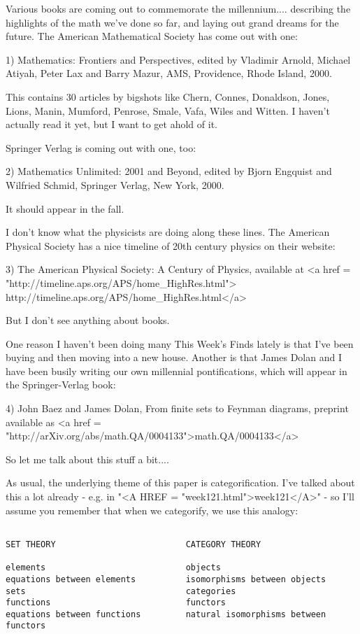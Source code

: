 

Various books are coming out to commemorate the millennium.... describing
the highlights of the math we've done so far, and laying out grand dreams 
for the future.  The American Mathematical Society has come out with one:

1) Mathematics: Frontiers and Perspectives, edited by Vladimir Arnold, 
Michael Atiyah, Peter Lax and Barry Mazur, AMS, Providence, Rhode 
Island, 2000.  

This contains 30 articles by bigshots like Chern, Connes, Donaldson,
Jones, Lions, Manin, Mumford, Penrose, Smale, Vafa, Wiles and Witten.
I haven't actually read it yet, but I want to get ahold of it.  

Springer Verlag is coming out with one, too:

2) Mathematics Unlimited: 2001 and Beyond, edited by Bjorn Engquist
and Wilfried Schmid, Springer Verlag, New York, 2000.  

It should appear in the fall.  

I don't know what the physicists are doing along these lines.  The 
American Physical Society has a nice timeline of 20th century physics 
on their website:

3) The American Physical Society: A Century of Physics, available
at <a href = "http://timeline.aps.org/APS/home_HighRes.html">
http://timeline.aps.org/APS/home_HighRes.html</a>

But I don't see anything about books.

One reason I haven't been doing many This Week's Finds lately is
that I've been buying and then moving into a new house.  Another
is that James Dolan and I have been busily writing our own millennial 
pontifications, which will appear in the Springer-Verlag book:

4) John Baez and James Dolan, From finite sets to Feynman diagrams,
preprint available as <a href = "http://arXiv.org/abs/math.QA/0004133">math.QA/0004133</a>

So let me talk about this stuff a bit....

As usual, the underlying theme of this paper is categorification.  
I've talked about this a lot already - e.g. in "<A HREF = "week121.html">week121</A>" - so I'll
assume you remember that when we categorify, we use this analogy:


\begin{verbatim}

SET THEORY                          CATEGORY THEORY

elements                            objects                       
equations between elements          isomorphisms between objects        
sets                                categories                    
functions                           functors                      
equations between functions         natural isomorphisms between functors  
\end{verbatim}
    
